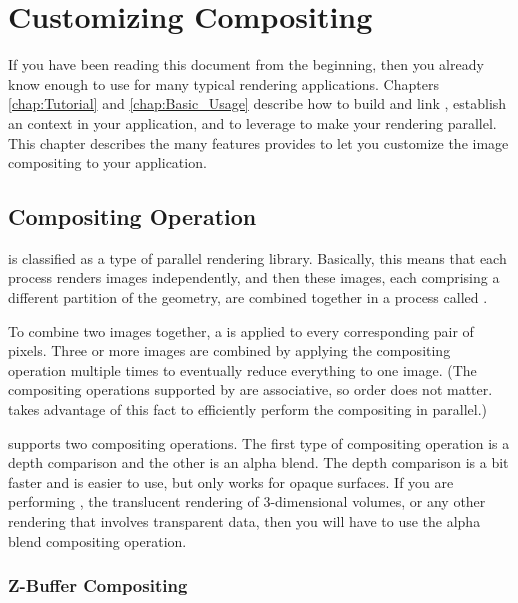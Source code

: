 
\chapter{Customizing Compositing}
\label{chap:Customizing_Compositing}

If you have been reading this document from the beginning, then you already
know enough to use \IceT for many typical rendering applications.  Chapters
\ref{chap:Tutorial} and \ref{chap:Basic_Usage} describe how to build and
link \IceT, establish an \IceT context in your application, and to leverage
\IceT to make your rendering parallel.  This chapter describes the many
features \IceT provides to let you customize the image compositing to your
application.

\section{Compositing Operation}
\label{sec:Customizing_Compositing:Compositing_Operation}

\IceT is classified as a  type of
parallel rendering library.  Basically, this means that each process
renders images independently, and then these images, each comprising a
different partition of the geometry, are combined together in a process
called .

To combine two images together, a  is
applied to every corresponding pair of pixels.  Three or more images are
combined by applying the compositing operation multiple times to eventually
reduce everything to one image.  (The compositing operations supported by
\IceT are associative, so order does not matter.  \IceT takes advantage of
this fact to efficiently perform the compositing in parallel.)

\IceT supports two compositing operations.  The first type of compositing
operation is a depth comparison and the other is an alpha blend.    The
depth comparison is a bit faster and is easier to use, but only works for
opaque surfaces.  If you are performing
, the translucent
rendering of 3-dimensional volumes, or any other rendering that involves
transparent data, then you will have to use the alpha blend compositing
operation.

\subsection{Z-Buffer Compositing}
\label{sec:Customizing_Compositing:User_Defined_Communicators}

